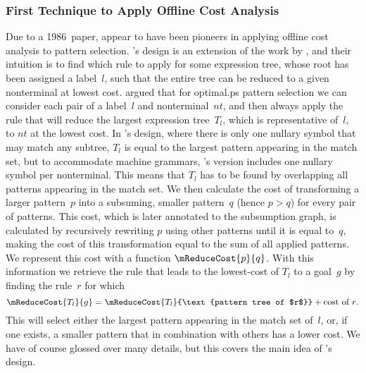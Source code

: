 \subsubsection{First Technique to Apply Offline Cost Analysis}

Due to a 1986~paper, \textcite{HatcherChristopher:1986} appear to have been
pioneers in applying \gls{offline cost analysis} to \gls{pattern selection}.
%
\citeauthor{HatcherChristopher:1986}'s design is an extension of the work by
\citeauthor{HoffmannODonnell:1982}, and their intuition is to find which
\gls{rule} to apply for some \gls{expression tree}, whose \gls{root} has been
assigned a label~$l$, such that the entire \gls{tree} can be reduced to a given
\gls{nonterminal} at lowest cost.
%
\citeauthor{HatcherChristopher:1986} argued that for \gls{optimal.ps}
\gls{pattern selection} we can consider each pair of a label~$l$ and
\gls{nonterminal}~$\mathit{nt}$, and then always apply the \gls{rule} that will
reduce the largest \gls{expression tree}~$T_l$, which is representative of~$l$,
to $\mathit{nt}$ at the lowest cost.
%
In \citeauthor{HoffmannODonnell:1982}'s design, where there is only one
\gls{nullary symbol} that may match any \gls{subtree}, $T_l$ is equal to the
largest \gls{pattern} appearing in the \gls{match set}, but to accommodate
\glspl{machine grammar}, \citeauthor{HatcherChristopher:1986}'s version includes
one \gls{nullary symbol} per \gls{nonterminal}.
%
This means that $T_l$ has to be found by overlapping all \glspl{pattern}
appearing in the \gls{match set}.
%
We then calculate the cost of transforming a larger \gls{pattern}~$p$ into a
subsuming, smaller \gls{pattern}~$q$ (hence \mbox{$p > q$}) for every pair of
\glspl{pattern}.
%
This cost, which is later annotated to the \gls{subsumption graph}, is
calculated by recursively rewriting $p$ using other \glspl{pattern} until it is
equal to~$q$, making the cost of this transformation equal to the sum of all
applied \glspl{pattern}.
%
We represent this cost with a function $\mReduceCost{p}{q}$.
%
With this information we retrieve the \gls{rule} that leads to the lowest-cost
 of $T_l$ to a goal~$g$ by finding the \gls{rule}~$r$
for which
%
\begin{displaymath}
  \mReduceCost{T_l}{g} =
  \mReduceCost{T_l}{\text{pattern tree of $r$}} + \text{cost of $r$}.
\end{displaymath}
%
This will select either the largest \gls{pattern} appearing in the \gls{match
  set} of~$l$, or, if one exists, a smaller \gls{pattern} that in combination
with others has a lower cost.
%
We have of course glossed over many details, but this covers the main idea of
\citeauthor{HatcherChristopher:1986}'s design.

